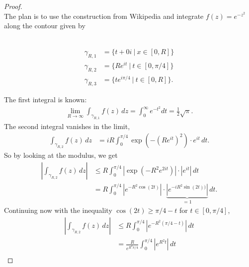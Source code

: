 \documentclass{article}
\begin{document}
\begin{proof} \text{} \\
  The plan is to use the construction from Wikipedia and integrate
  $f(z) = e^{-z^2}$ along the contour given by \begin{multicols}{2}
  \\
  \begin{align}
    \gamma_{R,1} &= \{t + 0i\ |\ x \in [0, R] \} \\
    \gamma_{R,2} &= \{R e^{it}\ |\ t \in [0,\pi/4] \} \\
    \gamma_{R,3} &= \{te^{i\pi/4}\ |\ t \in [0, R]\}.
  \end{align}
  \end{multicols}
  The first integral is known: \begin{align}
    \lim_{R\rightarrow \infty}\int_{\gamma_{R,1}} f(z)\,dz
      = \int_0^\infty e^{-t^2} dt
      = \frac{1}{2}\sqrt{\pi}.
  \end{align}
  The second integral vanishes in the limit, \begin{align}
    \int_{\gamma_{R,2}} f(z)\,dz
      &= iR\int_0^{\pi/4}\exp(-(Re^{it})^2)\cdot e^{it}\,dt.
  \end{align}
  So by looking at the modulus, we get \begin{align}
    \left|\int_{\gamma_{R,2}} f(z)\,dz\right|
    &\leq R\int_0^{\pi/4}|\exp(-R^2e^{2it})| \cdot |e^{it}|\,dt \\
    &= R\int_0^{\pi/4}|e^{-R^2\cos(2t)}|\cdot\underbrace{|e^{-iR^2\sin(2t))}|}_{=1}\,dt.
  \end{align}
  Continuing now with the inequality $\cos(2t) \geq \pi/4 - t$ for $t \in [0, \pi/4]$,
  \begin{align}
    \left|\int_{\gamma_{R,2}} f(z)\,dz\right|
    &\leq R\int_0^{\pi/4}|e^{-R^2(\pi/4 - t)}|\,dt \\
    &= \frac{R}{e^{R^2\pi/4}}\int_0^{\pi/4}|e^{R^2t}|\,dt \\

\end{align}
\end{proof}
\end{document}
